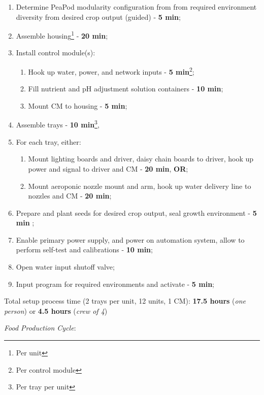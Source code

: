 \documentclass{report}
\begin{document}
\begin{enumerate}
    \item Determine PeaPod modularity configuration from from required environment diversity from desired crop output (guided) - \textbf{5 min};
    \item Assemble housing\footnote{Per unit} - \textbf{20 min};
    \item Install control module(s):
    \begin{enumerate}
        \item Hook up water, power, and network inputs - \textbf{5 min}\footnote{Per control module};
        \item Fill nutrient and pH adjustment solution containers - \textbf{10 min}\footnotemark[2];
        \item Mount CM to housing - \textbf{5 min}\footnotemark[2];
    \end{enumerate}
    \item Assemble trays - \textbf{10 min}\footnote{Per tray per unit}, 
    \item For each tray, either:
    \begin{enumerate}
        \item Mount lighting boards and driver, daisy chain boards to driver, hook up power and signal to driver and CM - \textbf{20 min}\footnotemark[3], \textbf{OR};
        \item Mount aeroponic nozzle mount and arm, hook up water delivery line to nozzles and CM - \textbf{20 min}\footnotemark[3];
    \end{enumerate}
    \item Prepare and plant seeds for desired crop output, seal growth environment - \textbf{5 min} \footnotemark[1];
    \item Enable primary power supply, and power on automation system, allow to perform self-test and calibrations - \textbf{10 min}\footnotemark[2];
    \item Open water input shutoff valve;
    \item Input program for required environments and activate - \textbf{5 min}\footnotemark[2];
\end{enumerate}

Total setup process time (2 trays per unit, 12 units, 1 CM): \textbf{17.5 hours} (\textit{one person}) or \textbf{4.5 hours} (\textit{crew of 4})

\textit{Food Production Cycle}:
\end{document}
